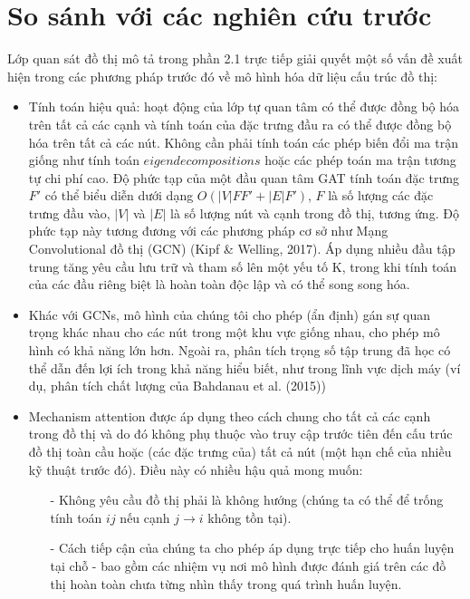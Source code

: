 \section{So sánh với các nghiên cứu trước}
\label{sec:So sánh với các nghiên cứu trước}
Lớp quan sát đồ thị mô tả trong phần 2.1 trực tiếp giải quyết một số vấn đề xuất hiện trong các phương pháp trước đó về mô hình hóa dữ liệu cấu trúc đồ thị:
	\begin{itemize}
		\item Tính toán hiệu quả: hoạt động của lớp tự quan tâm có thể được đồng bộ hóa trên tất cả các cạnh và tính toán của đặc trưng đầu ra có thể được đồng bộ hóa trên tất cả các nút. Không cần phải tính toán các phép biến đổi ma trận giống như tính toán $eigendecompositions$ hoặc các phép toán ma trận tương tự chi phí cao. Độ phức tạp của một đầu quan tâm GAT tính toán đặc trưng $F'$ có thể biểu diễn dưới dạng $O(|V|F F' + |E|F')$, $F$ là số lượng các đặc trưng đầu vào, $|V|$ và $|E|$ là số lượng nút và cạnh trong đồ thị, tương ứng. Độ phức tạp này tương đương với các phương pháp cơ sở như Mạng Convolutional đồ thị (GCN) (Kipf \& Welling, 2017). Áp dụng nhiều đầu tập trung tăng yêu cầu lưu trữ và tham số lên một yếu tố K, trong khi tính toán của các đầu riêng biệt là hoàn toàn độc lập và có thể song song hóa.
		
		\item Khác với GCNs, mô hình của chúng tôi cho phép (ẩn định) gán sự quan trọng khác nhau cho các nút trong một khu vực giống nhau, cho phép mô hình có khả năng lớn hơn. Ngoài ra, phân tích trọng số tập trung đã học có thể dẫn đến lợi ích trong khả năng hiểu biết, như trong lĩnh vực dịch máy (ví dụ, phân tích chất lượng của Bahdanau et al. (2015))
		
		\item Mechanism attention được áp dụng theo cách chung cho tất cả các cạnh trong đồ thị và do đó không phụ thuộc vào truy cập trước tiên đến cấu trúc đồ thị toàn cầu hoặc (các đặc trưng của) tất cả nút (một hạn chế của nhiều kỹ thuật trước đó). Điều này có nhiều hậu quả mong muốn:
			\begin{itemize}
				\item[-] Không yêu cầu đồ thị phải là không hướng (chúng ta có thể để trống tính toán $ij$ nếu cạnh 
				\(j \longrightarrow i\)
				không tồn tại).
				
				\item[-] Cách tiếp cận của chúng ta cho phép áp dụng trực tiếp cho huấn luyện tại chỗ - bao gồm các nhiệm vụ nơi mô hình được đánh giá trên các đồ thị hoàn toàn chưa từng nhìn thấy trong quá trình huấn luyện.
			\end{itemize}
		

\end{itemize}
